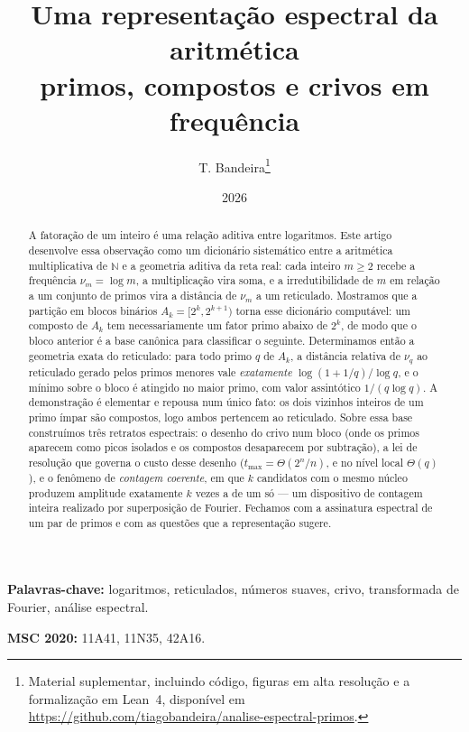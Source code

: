 \documentclass[11pt,a4paper]{article}
\title{\bfseries Uma representação espectral da aritmética\\[0.35em]
\large primos, compostos e crivos em frequência}
\author{T. Bandeira\thanks{%
Material suplementar, incluindo código, figuras em alta resolução e a
formalização em Lean~4, disponível em
\url{https://github.com/tiagobandeira/analise-espectral-primos}.}}
\date{2026}
\theoremstyle{plain}
\theoremstyle{definition}
\theoremstyle{remark}
\newcommand{\N}{\mathbb{N}}
\newcommand{\nfreq}[1]{\nu_{#1}}
\begin{document}
\maketitle

\begin{abstract}
\noindent
A fatoração de um inteiro é uma relação aditiva entre logaritmos. Este artigo
desenvolve essa observação como um dicionário sistemático entre a aritmética
multiplicativa de $\N$ e a geometria aditiva da reta real: cada inteiro $m\ge2$
recebe a frequência $\nfreq{m}=\log m$, a multiplicação vira soma, e a
irredutibilidade de $m$ em relação a um conjunto de primos vira a distância de
$\nfreq{m}$ a um reticulado. Mostramos que a partição em blocos binários
$A_k=[2^k,2^{k+1})$ torna esse dicionário computável: um composto de $A_k$ tem
necessariamente um fator primo abaixo de $2^k$, de modo que o bloco anterior é a
base canônica para classificar o seguinte. Determinamos então a geometria exata do
reticulado: para todo primo $q$ de $A_k$, a distância relativa de $\nfreq{q}$ ao
reticulado gerado pelos primos menores vale \emph{exatamente}
$\log(1+1/q)/\log q$, e o mínimo sobre o bloco é atingido no maior primo, com valor
assintótico $1/(q\log q)$. A demonstração é elementar e repousa num único fato: os
dois vizinhos inteiros de um primo ímpar são compostos, logo ambos pertencem ao
reticulado. Sobre essa base construímos três retratos espectrais: o desenho do
crivo num bloco (onde os primos aparecem como picos isolados e os compostos
desaparecem por subtração), a lei de resolução que governa o custo desse desenho
($t_{\max}=\Theta(2^n/n)$, e no nível local $\Theta(q)$), e o fenômeno de
\emph{contagem coerente}, em que $k$ candidatos com o mesmo núcleo produzem
amplitude exatamente $k$ vezes a de um só — um dispositivo de contagem inteira
realizado por superposição de Fourier. Fechamos com a assinatura espectral de um
par de primos e com as questões que a representação sugere.
\end{abstract}

\vspace{0.4em}
\noindent\textbf{Palavras-chave:} logaritmos, reticulados, números suaves, crivo,
transformada de Fourier, análise espectral.

\vspace{0.2em}
\noindent\textbf{MSC 2020:} 11A41, 11N35, 42A16.

\tableofcontents

\bigskip











\end{document}
